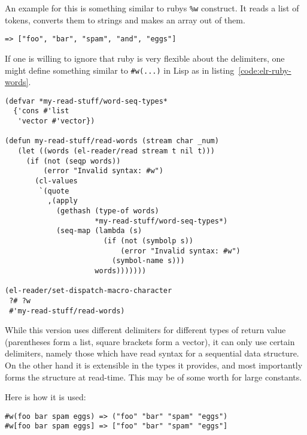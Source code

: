 \documentclass[a4paper,10pt,twoside]{report}
\begin{document}
An example for this is something similar to rubys \texttt{\%w} construct.  It
reads a list of tokens, converts them to strings and makes an array out of
them.  

\begin{lstlisting}[style=rubyinline]
%w(foo bar spam and eggs) 
=> ["foo", "bar", "spam", "and", "eggs"]
\end{lstlisting}

If one is willing to ignore that ruby is very flexible about the delimiters, one
might define something similar to \texttt{\#w(...)} in Lisp as in
listing~\ref{code:elr-ruby-words}.

\begin{lstlisting}[style=lispcode,caption={A read macro for rubys word
  syntax.}, label={code:elr-ruby-words}]
(defvar *my-read-stuff/word-seq-types*
  {'cons #'list 
   'vector #'vector})

(defun my-read-stuff/read-words (stream char _num)
   (let ((words (el-reader/read stream t nil t)))
     (if (not (seqp words))
         (error "Invalid syntax: #w")
       (cl-values
        `(quote
          ,(apply
            (gethash (type-of words)
                     *my-read-stuff/word-seq-types*)
            (seq-map (lambda (s)
                       (if (not (symbolp s))
                           (error "Invalid syntax: #w")
                         (symbol-name s)))
                     words)))))))

(el-reader/set-dispatch-macro-character
 ?# ?w
 #'my-read-stuff/read-words)
\end{lstlisting}

While this version uses different delimiters for different types of return value
(parentheses form a list, square brackets form a vector), it can only use
certain delimiters, namely those which have read syntax for a sequential data
structure.  On the other hand it is extensible in the types it provides, and
most importantly forms the structure at read-time.  This may be of some worth
for large constants.

Here is how it is used:

\begin{lstlisting}[style=rubyinline]
#w(foo bar spam eggs) => ("foo" "bar" "spam" "eggs")
#w[foo bar spam eggs] => ["foo" "bar" "spam" "eggs"]
\end{lstlisting}

\end{document}
